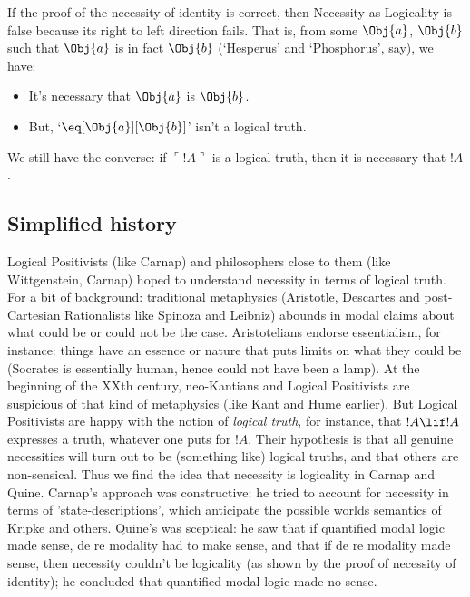 \documentclass[../../../include/open-logic-section]{subfiles}
\begin{document}
If the proof of the necessity of identity is correct, then Necessity 
as Logicality is false because its right to left direction fails. 
That is, from some $\Obj{a}$, $\Obj{b}$ such that $\Obj{a}$ is in fact $\Obj{b}$ (`Hesperus'
and `Phosphorus', say), we have: 

\begin{itemize}
\item It's necessary that $\Obj{a}$ is $\Obj{b}$.
\item But, `$\eq[\Obj{a}][\Obj{b}]$' isn't a logical truth.
\end{itemize}

We still have the converse: if $\ulcorner!A\urcorner$ is a logical 
truth, then it is necessary that $!A$.

\subsection{Simplified history} 
Logical Positivists (like Carnap) and 
philosophers close to them (like Wittgenstein, Carnap) hoped to 
understand necessity in terms of logical truth. For a bit of background:
traditional metaphysics (Aristotle, Descartes
and post-Cartesian Rationalists like Spinoza and Leibniz) abounds in
modal claims about what could be or could not be the case. Aristotelians
endorse essentialism, for instance: things have an essence or nature 
that puts limits on what they could be (Socrates is essentially human,
hence could not have been a lamp). At the
beginning of the XXth century, neo-Kantians and Logical Positivists
are suspicious of that kind of metaphysics (like Kant and Hume
earlier). But Logical Positivists are happy with the notion of 
\emph{logical truth}, for instance, that $!A\lif!A$ expresses a 
truth, whatever one puts for $!A$. Their hypothesis is that all 
genuine necessities will turn out to be (something like) 
logical truths, and that others are non-sensical. Thus we find the idea
that necessity is logicality in Carnap and Quine. Carnap's approach was
constructive: he tried to account for necessity in terms of 
'state-descriptions', which anticipate the possible worlds semantics
of Kripke and others. Quine's was sceptical: he saw that if quantified
modal logic made sense, de re modality had to make sense, and that if
de re modality made sense, then necessity couldn't be logicality (as
shown by the proof of necessity of identity); he concluded that 
quantified modal logic made no sense.
\end{document}
